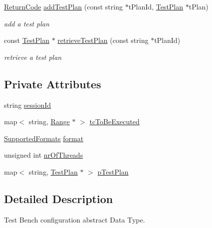 \begin{DoxyCompactItemize}
\hyperlink{structit_1_1testbench_1_1data_1_1ReturnCode}{Return\-Code} \hyperlink{classit_1_1testbench_1_1data_1_1TestBenchConfiguration_ab025ba7723876619e0bfed3668312688}{add\-Test\-Plan} (const string $\ast$t\-Plan\-Id, \hyperlink{classit_1_1testbench_1_1data_1_1TestPlan}{Test\-Plan} $\ast$t\-Plan)
\begin{DoxyCompactList}\small\item\em add a test plan \end{DoxyCompactList}\item 
const \hyperlink{classit_1_1testbench_1_1data_1_1TestPlan}{Test\-Plan} $\ast$ \hyperlink{classit_1_1testbench_1_1data_1_1TestBenchConfiguration_a953e57b04261f7e8a96bc522990d452f}{retrieve\-Test\-Plan} (const string $\ast$t\-Plan\-Id)
\begin{DoxyCompactList}\small\item\em retrieve a test plan \end{DoxyCompactList}\end{DoxyCompactItemize}
\subsection*{Private Attributes}
\begin{DoxyCompactItemize}
\item 
string \hyperlink{classit_1_1testbench_1_1data_1_1TestBenchConfiguration_a3fb6f36b584fee53c0d5e38d8095201d}{session\-Id}
\item 
map$<$ string, \hyperlink{structit_1_1testbench_1_1data_1_1Range}{Range} $\ast$ $>$ \hyperlink{classit_1_1testbench_1_1data_1_1TestBenchConfiguration_aba40dc49cadad99daa3cce208c5507b1}{tc\-To\-Be\-Executed}
\item 
\hyperlink{namespaceit_1_1testbench_1_1data_afb7601d9882295fae3688eaee6a418f2}{Supported\-Formats} \hyperlink{classit_1_1testbench_1_1data_1_1TestBenchConfiguration_abaced1b870ac640b02227c6ffcc6ddcd}{format}
\item 
unsigned int \hyperlink{classit_1_1testbench_1_1data_1_1TestBenchConfiguration_afe806efbb1076104b8f5f6e5fdf69d2d}{nr\-Of\-Threads}
\item 
map$<$ string, \hyperlink{classit_1_1testbench_1_1data_1_1TestPlan}{Test\-Plan} $\ast$ $>$ \hyperlink{classit_1_1testbench_1_1data_1_1TestBenchConfiguration_af7bbd2effac8a1e67cbdffea28e21201}{p\-Test\-Plan}
\end{DoxyCompactItemize}


\subsection{Detailed Description}
Test Bench configuration abstract Data Type.

